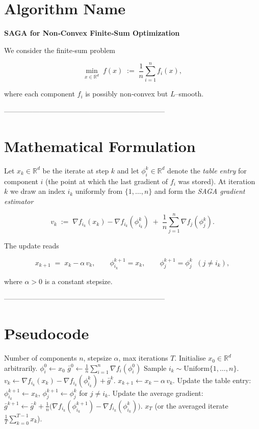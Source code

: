\documentclass{article}
\newcommand{\R}{\mathbb{R}}
\newcommand{\grad}{\nabla}
\begin{document}
\section*{Algorithm Name}
\textbf{SAGA for Non‑Convex Finite‑Sum Optimization}  

We consider the finite‑sum problem  

\[
\min_{x\in\R^{d}} \; f(x) \;:=\; \frac{1}{n}\sum_{i=1}^{n} f_i(x),
\tag{1}
\]

where each component $f_i$ is possibly non‑convex but $L$–smooth.

--------------------------------------------------------------------

\section*{Mathematical Formulation}
Let $x_k\in\R^{d}$ be the iterate at step $k$ and let $\phi_i^{k}\in\R^{d}$ denote the \emph{table entry} for component $i$ (the point at which the last gradient of $f_i$ was stored).  
At iteration $k$ we draw an index $i_k$ uniformly from $\{1,\dots ,n\}$ and form the \emph{SAGA gradient estimator}

\[
v_k \;:=\; \grad f_{i_k}(x_k)-\grad f_{i_k}(\phi^{k}_{i_k})
        \;+\; \frac{1}{n}\sum_{j=1}^{n}\grad f_{j}(\phi^{k}_{j}) .
\tag{2}
\]

The update reads  

\[
x_{k+1}\;=\;x_k-\alpha\, v_k,
\qquad
\phi^{k+1}_{i_k}=x_k,\qquad 
\phi^{k+1}_{j}= \phi^{k}_{j}\;\;(j\neq i_k),
\tag{3}
\]

where $\alpha>0$ is a constant stepsize.

--------------------------------------------------------------------

\section*{Pseudocode}
\begin{algorithm}[H]
\caption{SAGA (non‑convex)}\label{alg:saga}
\begin{algorithmic}[1]
\Require Number of components $n$, stepsize $\alpha$, max iterations $T$.
\State Initialise $x_0\in\R^{d}$ arbitrarily.
    \State $\phi_i^{0}\gets x_0$ 
\EndFor
\State $\displaystyle \bar g^{0}\gets \frac1n\sum_{i=1}^{n}\grad f_i(\phi_i^{0})$ 
    \State Sample $i_k\sim\text{Uniform}\{1,\dots ,n\}$.
    \State $v_k \gets \grad f_{i_k}(x_k)-\grad f_{i_k}(\phi^{k}_{i_k})+\bar g^{k}$.
    \State $x_{k+1}\gets x_k-\alpha\,v_k$.
    \State Update the table entry:
          $\phi^{k+1}_{i_k}\gets x_k$, \; $\phi^{k+1}_{j}\gets\phi^{k}_{j}$ for $j\neq i_k$.
    \State Update the average gradient:
          $\displaystyle \bar g^{k+1}\gets \bar g^{k}
                 +\frac{1}{n}\bigl(\grad f_{i_k}(\phi^{k+1}_{i_k})-\grad f_{i_k}(\phi^{k}_{i_k})\bigr)$.
\EndFor
\State \Return $x_T$ (or the averaged iterate $\frac1T\sum_{k=0}^{T-1}x_k$).
\end{algorithmic}
\end{algorithm}
\end{document}
